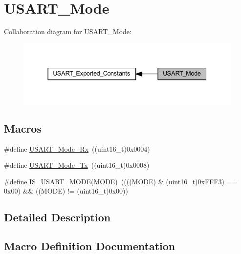 \hypertarget{group___u_s_a_r_t___mode}{}\section{U\+S\+A\+R\+T\+\_\+\+Mode}
\label{group___u_s_a_r_t___mode}
Collaboration diagram for U\+S\+A\+R\+T\+\_\+\+Mode\+:
\nopagebreak
\begin{figure}[H]
\begin{center}
\leavevmode
\includegraphics[width=337pt]{group___u_s_a_r_t___mode}
\end{center}
\end{figure}
\subsection*{Macros}
\begin{DoxyCompactItemize}
\item 
\#define \hyperlink{group___u_s_a_r_t___mode_gafefcc3d3c1a1f83b425784fa6289aecf}{U\+S\+A\+R\+T\+\_\+\+Mode\+\_\+\+Rx}~((uint16\+\_\+t)0x0004)
\item 
\#define \hyperlink{group___u_s_a_r_t___mode_ga22b2813509a062435ea68d086ec565b4}{U\+S\+A\+R\+T\+\_\+\+Mode\+\_\+\+Tx}~((uint16\+\_\+t)0x0008)
\item 
\#define \hyperlink{group___u_s_a_r_t___mode_gae9140e5ca405d2377fe0e82c79e136a2}{I\+S\+\_\+\+U\+S\+A\+R\+T\+\_\+\+M\+O\+DE}(M\+O\+DE)~((((M\+O\+DE) \& (uint16\+\_\+t)0x\+F\+F\+F3) == 0x00) \&\& ((\+M\+O\+D\+E) != (uint16\+\_\+t)0x00))
\end{DoxyCompactItemize}


\subsection{Detailed Description}


\subsection{Macro Definition Documentation}
\mbox{\label{group___u_s_a_r_t___mode_gae9140e5ca405d2377fe0e82c79e136a2}} 
